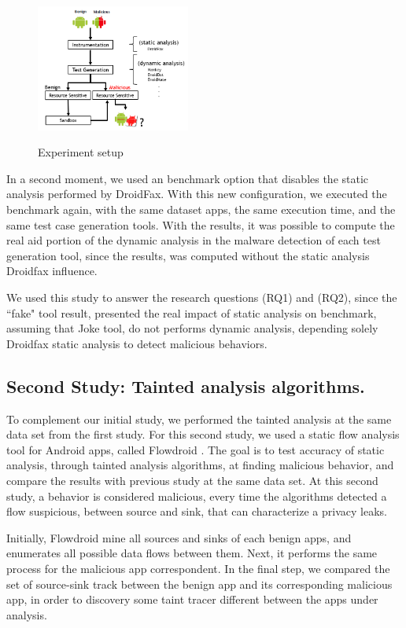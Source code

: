 \begin{figure}[ht]
  \includegraphics[width=0.45\textwidth]{images/setup.png}
  \label{Experiment setup}
  \caption{Experiment setup}
  \label{fig:setup}
\end{figure}

In a second moment, we used an benchmark option that disables the static analysis performed by DroidFax. With this new configuration, we executed the benchmark again, with the same dataset apps, the same execution time, and the same test case generation tools. With the results, it was possible to compute the real aid portion of the dynamic analysis in the malware detection of each test generation tool, since the results, was computed without the static analysis Droidfax influence.

We used this study to answer the research questions (RQ1) and (RQ2), since the ``fake" tool result, presented the real impact of static analysis on benchmark, assuming that Joke tool, do not performs dynamic analysis, depending solely Droidfax static analysis to detect malicious behaviors.


\subsection{Second Study: Tainted analysis algorithms.}

To complement our initial study, we performed the tainted analysis at the same data set from the first study. For this second study, we used a static flow analysis tool for Android apps, called Flowdroid \cite{10.1145/2666356.2594299}. The goal is to test accuracy of static analysis, through tainted analysis algorithms, at finding malicious behavior, and compare the results with previous study at the same data set. At this second study, a behavior is considered malicious, every time the algorithms detected a flow suspicious, between source and sink, that can characterize a privacy leaks.

Initially, Flowdroid mine all sources and sinks of each benign apps, and enumerates all possible data flows between them. Next, it performs the same process for the malicious app correspondent. In the final step, we compared the set of source-sink track between the benign app and its corresponding malicious app, in order to discovery some taint tracer different between the apps under analysis.

